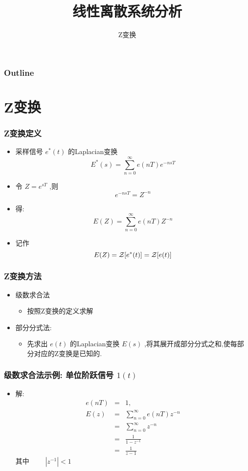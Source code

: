 \documentclass[table]{beamer}
\subtitle{Z变换}
\title{线性离散系统分析}
\author{}
\date{}
\begin{document}
\maketitle

\begin{frame}
\frametitle{Outline}
\setcounter{tocdepth}{3}
\tableofcontents
\end{frame}












\section{Z变换}
\label{sec-1}
\begin{frame}
\frametitle{Z变换定义}
\label{sec-1-1}

\begin{itemize}
\item 采样信号  $e^*(t)$  的Laplacian变换  
      \[E^*(s)=\sum_{n=0}^{\infty}e(nT)e^{-nsT}\]
\item <2->令  $Z=e^{sT}$ ,则  
      \[e^{-nsT}=Z^{-n}\]
\item <3->得:  
      \[E(Z)=\sum_{n=0}^{\infty}e(nT)Z^{-n}\]
\item <3->记作  
      \[E(Z)={\cal Z}[e^*(t)]={\cal Z}[e(t)]\]
\end{itemize}
\end{frame}
\begin{frame}
\frametitle{Z变换方法}
\label{sec-1-2}

\begin{itemize}
\item 级数求合法
\begin{itemize}
\item 按照Z变换的定义求解
\end{itemize}
\item 部分分式法:
\begin{itemize}
\item 先求出  $e(t)$  的Laplacian变换  $E(s)$  ,将其展开成部分分式之和,使每部分对应的Z变换是已知的.
\end{itemize}
\end{itemize}
\end{frame}
\begin{frame}
\frametitle{级数求合法示例: 单位阶跃信号 $1(t)$}
\label{sec-1-3}

\begin{itemize}
\item <2-> 解: 
      \begin{eqnarray*}
      e(nT)&=&1 , \\
      E(z) &=  &\sum_{n=0}^{\infty}e(nT)z^{-n} \\
       &=& \sum_{n=0}^{\infty}z^{-n} \\
      &=& \frac{1}{1-z^{-1}} \\
      &=& \frac{1}{z-1}
      \end{eqnarray*}
      其中  $\qquad |z^{-1}|<1$
\end{itemize}
\end{frame}
\end{document}
